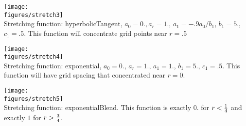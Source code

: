 \noindent
\begin{minipage}{.475\linewidth}
  \begin{center}
   \texttt{[image: \\figures/stretch3]} \\
  {Stretching function: hyperbolicTangent, $a_0=0., a_r=1.$, $a_1=-.9 a_0/b_1$, $b_1=5.$, $c_1=.5$. This function
    will concentrate grid points near $r=.5$} 
  \end{center}
\end{minipage}\hfill
\begin{minipage}{.475\linewidth}
  \begin{center}
   \texttt{[image: \\figures/stretch4]} \\
  {Stretching function: exponential, $a_0=0.$, $a_r=1.$, $a_1=1.$, $b_1=5.$, $c_1=.5$.
    This function will have grid spacing that concentrated near $r=0.$ } 
  \end{center}
\end{minipage}

\noindent
\begin{minipage}{.475\linewidth}
  \begin{center}
    \texttt{[image: \\figures/stretch5]} \\
  {Stretching function: exponentialBlend. This function is exactly $0.$ for $r<{1\over4}$ and
    exactly $1$ for $r>{3\over4}$.}
  \end{center}
\end{minipage}\hfill


